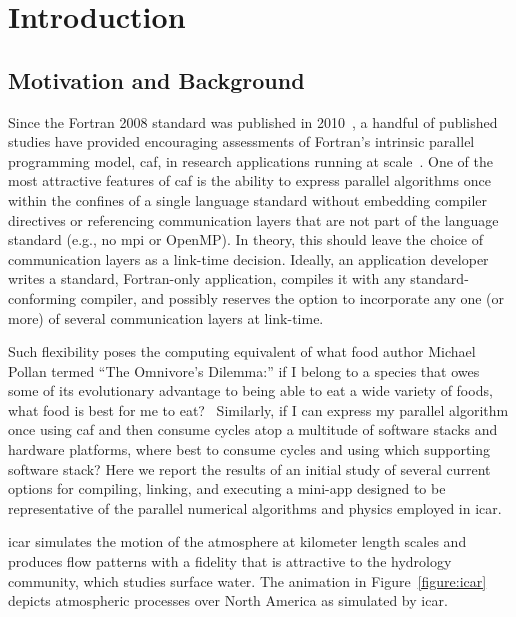 \section{Introduction}
\subsection{Motivation and Background}
Since the Fortran 2008 standard was published in 2010~\cite{iso2010information}, a handful of published studies
have provided encouraging assessments of Fortran's intrinsic parallel programming model, \gls{caf}, in research
applications running at scale~\cite{preissl2011multithreaded,garain2015comparing,mozdzynski2015partitioned}.   One of the
most attractive features of \gls{caf} is the ability to express parallel algorithms once within the confines of a single
language standard without embedding compiler directives or referencing communication layers that are not part of the
language standard (e.g., no \gls{mpi} or OpenMP).  In theory, this should leave the choice of communication layers
as a link-time decision.  Ideally, an application developer writes a standard, Fortran-only application, compiles it with any
standard-conforming compiler, and possibly reserves the option to incorporate any one (or more) of several communication layers
at link-time.

Such flexibility poses the computing equivalent of what food author Michael Pollan termed ``The Omnivore's Dilemma:'' if I
belong to a species that owes some of its evolutionary advantage to being able to eat a wide variety of foods, what food is
best for me to eat?~\cite{pollan2006omnivore}  Similarly, if I can express my parallel algorithm once using \gls{caf} and then consume cycles atop a
multitude of software stacks and hardware platforms, where best to consume cycles and using which supporting software stack?
Here we report the results of an initial study of several current options for compiling, linking, and executing a \gls{mini-app}
designed to be representative of the parallel numerical algorithms and physics employed in \gls{icar}.

\gls{icar} simulates the motion of the atmosphere at kilometer length scales and produces flow patterns with a fidelity that is
attractive to the hydrology community, which studies surface water.  The animation in Figure~\ref{figure:icar} depicts atmospheric
processes over North America as simulated by \gls{icar}.

